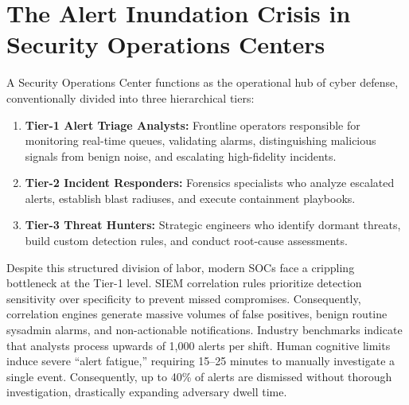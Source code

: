 \section{The Alert Inundation Crisis in Security Operations Centers}
\label{sec:alert_crisis}
A Security Operations Center functions as the operational hub of cyber defense, conventionally divided into three hierarchical tiers:
\begin{enumerate}
  \item \textbf{Tier-1 Alert Triage Analysts:} Frontline operators responsible for monitoring real-time queues, validating alarms, distinguishing malicious signals from benign noise, and escalating high-fidelity incidents.
  \item \textbf{Tier-2 Incident Responders:} Forensics specialists who analyze escalated alerts, establish blast radiuses, and execute containment playbooks.
  \item \textbf{Tier-3 Threat Hunters:} Strategic engineers who identify dormant threats, build custom detection rules, and conduct root-cause assessments.
\end{enumerate}

Despite this structured division of labor, modern SOCs face a crippling bottleneck at the Tier-1 level. SIEM correlation rules prioritize detection sensitivity over specificity to prevent missed compromises. Consequently, correlation engines generate massive volumes of false positives, benign routine sysadmin alarms, and non-actionable notifications. Industry benchmarks indicate that analysts process upwards of 1,000 alerts per shift. Human cognitive limits induce severe ``alert fatigue,'' requiring 15--25 minutes to manually investigate a single event. Consequently, up to 40\% of alerts are dismissed without thorough investigation, drastically expanding adversary dwell time.

